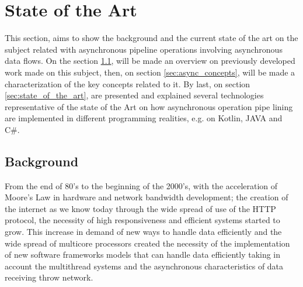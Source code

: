 % 
%  
%
\chapter{State of the Art}
\label{cha:users_manual}

This section, aims to show the background and the current state of the art on the subject related with asynchronous pipeline operations involving asynchronous data flows.  
On the section \ref{sec:related_work}, will be made an overview on previously developed work made on this subject, then, on section \ref{sec:async_concepts}, will be made a characterization of the key concepts related to it. By last, on section \ref{sec:state_of_the_art}, are presented and explained several technologies representative of the state of the Art on how asynchronous operation pipe lining are implemented in different programming realities, e.g. on Kotlin, JAVA and C\#. 


\section{Background} %
\label{sec:related_work}


From the end of 80’s to the beginning of the 2000’s, with the acceleration of Moore's Law in hardware and network bandwidth development; the creation of the internet as we know today through the wide spread of use of the HTTP protocol, the necessity of high responsiveness and efficient systems started to grow. This increase in demand of new ways to handle data efficiently and the wide spread of multicore processors created the necessity of the implementation of new software frameworks models that can handle data efficiently taking in account the multithread systems and the asynchronous characteristics of data receiving throw network. 

